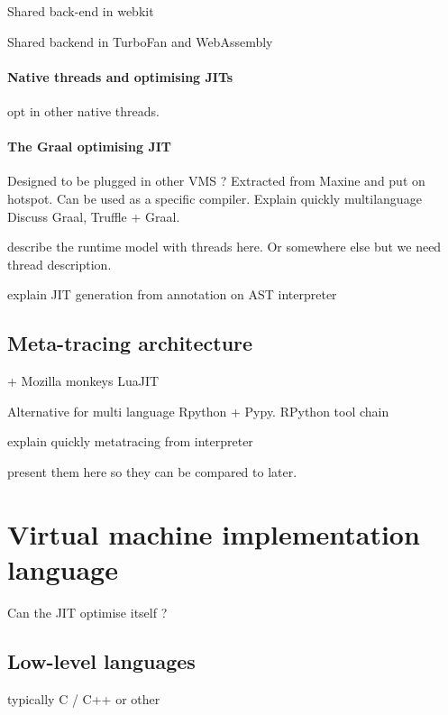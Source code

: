 \documentclass[a4paper,12pt,twoside]{../includes/ThesisStyle}
\begin{document}
Shared back-end in webkit 

Shared backend in TurboFan and WebAssembly

\paragraph{Native threads and optimising JITs}

opt in other native threads.

\paragraph{The Graal optimising JIT}

Designed to be plugged in other VMS ? Extracted from Maxine and put on hotspot. Can be used as a specific compiler.
Explain quickly multilanguage
Discuss Graal, Truffle + Graal.

describe the runtime model with threads here. Or somewhere else but we need thread description.

explain JIT generation from annotation on AST interpreter

\subsection{Meta-tracing architecture}

+ Mozilla monkeys
LuaJIT

Alternative for multi language
Rpython + Pypy.
RPython tool chain \cite{Rigo06a}

explain quickly metatracing from interpreter

present them here so they can be compared to later.


\section{Virtual machine implementation language}

Can the JIT optimise itself ?

\subsection{Low-level languages}

typically C / C++ or other
\end{document}
